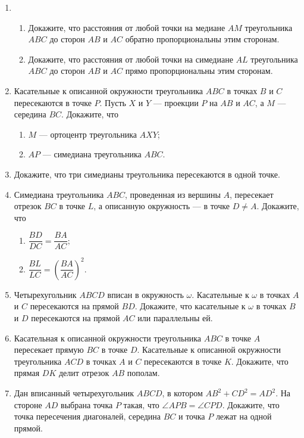 \documentclass{article}
\begin{document}
\begin{enumerate}[label*=\protect\fbox{\arabic{enumi}}]
\item 
\begin{enumerate}
	\item Докажите, что расстояния от любой точки на медиане $ AM $ треугольника $ ABC $ до сторон $ AB $ и $ AC $ обратно пропорциональны этим сторонам.
	\item Докажите, что расстояния от любой точки на симедиане $ AL $ треугольника $ ABC $ до сторон $ AB $ и $ AC $ прямо пропорциональны этим сторонам.
\end{enumerate}

\item Касательные к описанной окружности треугольника $ ABC $ в точках $ B $ и $ C $ пересекаются в точке $ P $. Пусть $ X $ и $ Y $ — проекции $ P $ на $ AB $ и $ AC $, а $ M $ — середина $ BC $. Докажите, что

\begin{enumerate}
	\item $ M $ — ортоцентр треугольника $ AXY $;
	\item $ AP $ — симедиана треугольника $ ABC $.
\end{enumerate}

\item Докажите, что три симедианы треугольника пересекаются в одной точке.
\item Симедиана треугольника $ ABC $, проведенная из вершины $ A $, пересекает отрезок $ BC $ в точке $ L $, а описанную окружность — в точке $ D \neq A $. Докажите, что
\begin{enumerate}
	\item $ \dfrac{BD}{DC} = \dfrac{BA}{AC}; $
	\item $ \dfrac{BL}{LC} = \left( \dfrac{BA}{AC}\right) ^2$.
\end{enumerate}

\item Четырехугольник $ ABCD $ вписан в окружность $\omega$. Касательные к $\omega$ в точках $ A $ и $ C $ пересекаются на прямой $ BD $. Докажите, что касательные к $\omega$ в точках $ B $ и $ D $ пересекаются на прямой $ AC $ или параллельны ей.
\item Касательная к описанной окружности треугольника $ ABC $ в точке $ A $ пересекает прямую $ BC $ в точке $ D $. Касательные к описанной окружности треугольника $ ACD $ в точках $ A $ и $ C $ пересекаются в точке $ K $. Докажите, что прямая $ DK $ делит отрезок $ AB $ пополам.
\item Дан вписанный четырехугольник $ ABCD $, в котором $AB^2 + CD^2 = AD^2 $. На стороне $ AD $ выбрана точка $ P $ такая, что $ \angle APB = \angle CPD $. Докажите, что точка пересечения диагоналей, середина $ BC $ и точка $ P $ лежат на одной прямой.


\end{enumerate}
\end{document}
